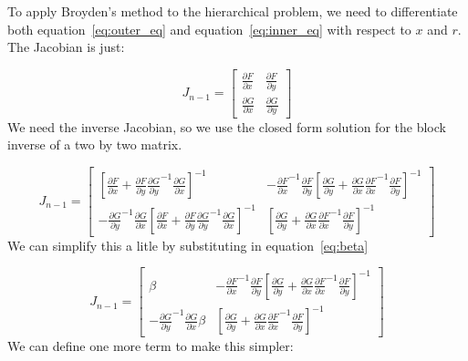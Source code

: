 \documentclass{article}
\begin{document}
To apply Broyden's method to the hierarchical problem, we need to differentiate both equation~\eqref{eq:outer_eq} and equation~\eqref{eq:inner_eq} with respect
to $x$ and $r$. The Jacobian is just:

\begin{equation}
  J_{n-1} =
  \begin{bmatrix}
     \frac{\partial F}{\partial x}  &  \frac{\partial F}{\partial y} \\
     \frac{\partial G}{\partial x}  &  \frac{\partial G}{\partial y}
  \end{bmatrix}
\end{equation}
We need the inverse Jacobian, so we use the closed form solution for the block inverse of a two by two matrix.

\begin{equation}
  J_{n-1} =
  \begin{bmatrix}
    \left[ \frac{\partial F}{\partial x} + \frac{\partial F}{\partial y} {\frac{\partial G}{\partial y}}^{-1} \frac{\partial G}{\partial x} \right]^{-1} &
    - {\frac{\partial F}{\partial x}}^{-1} \frac{\partial F}{\partial y} \left[ \frac{\partial G}{\partial y} + \frac{\partial G}{\partial x} {\frac{\partial F}{\partial x}}^{-1} \frac{\partial F}{\partial y} \right]^{-1} \\
    - {\frac{\partial G}{\partial y}}^{-1} \frac{\partial G}{\partial x} \left[ \frac{\partial F}{\partial x} + \frac{\partial F}{\partial y} {\frac{\partial G}{\partial y}}^{-1} \frac{\partial G}{\partial x} \right]^{-1} &
    \left[ \frac{\partial G}{\partial y} + \frac{\partial G}{\partial x} {\frac{\partial F}{\partial x}}^{-1} \frac{\partial F}{\partial y} \right]^{-1}
  \end{bmatrix}
\end{equation}
We can simplify this a litle by substituting in equation~\eqref{eq:beta}

\begin{equation}
  J_{n-1} =
  \begin{bmatrix}
    \beta &
    - {\frac{\partial F}{\partial x}}^{-1} \frac{\partial F}{\partial y} \left[ \frac{\partial G}{\partial y} + \frac{\partial G}{\partial x} {\frac{\partial F}{\partial x}}^{-1} \frac{\partial F}{\partial y} \right]^{-1} \\
    - {\frac{\partial G}{\partial y}}^{-1} \frac{\partial G}{\partial x} \beta &
    \left[ \frac{\partial G}{\partial y} + \frac{\partial G}{\partial x} {\frac{\partial F}{\partial x}}^{-1} \frac{\partial F}{\partial y} \right]^{-1}
  \end{bmatrix}
\end{equation}
We can define one more term to make this simpler:
\end{document}
